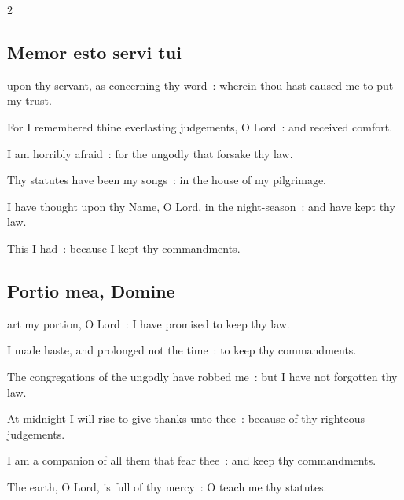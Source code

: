 \begin{multicols}{2}
\subsection{Memor esto servi tui}

 upon thy servant, as concerning thy word~: wherein thou hast caused me to put my trust.\par
{}
For I remembered thine everlasting judgements, O Lord~: and received comfort.\par
{}I am horribly afraid~: for the ungodly that forsake thy law.\par
{}Thy statutes have been my songs~: in the house of my pilgrimage.\par
{}I have thought upon thy Name, O Lord, in the night-season~: and have kept thy law.\par
{}This I had~: because I kept thy commandments.\par


\subsection{Portio mea, Domine}


 art my portion, O Lord~: I have promised to keep thy law.\par
{}
I made haste, and prolonged not the time~: to keep thy commandments.\par
{}The congregations of the ungodly have robbed me~: but I have not forgotten thy law.\par
{}At midnight I will rise to give thanks unto thee~: because of thy righteous judgements.\par
{}I am a companion of all them that fear thee~: and keep thy commandments.\par
{}The earth, O Lord, is full of thy mercy~: O teach me thy statutes.\par


\end{multicols}
